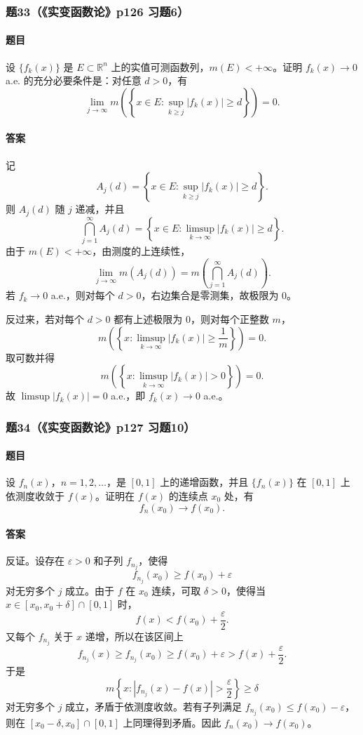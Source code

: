 \documentclass{article}
\newcommand{\R}{\mathbb{R}}
\newcommand{\eps}{\varepsilon}
\newcommand{\meas}{m}
\begin{document}
	\subsubsection*{题33（《实变函数论》p126 习题6）}
	\paragraph{题目}设 $\{f_k(x)\}$ 是 $E\subset\R^n$ 上的实值可测函数列，$\meas(E)<+\infty$。证明 $f_k(x)\to0$ a.e. 的充分必要条件是：对任意 $d>0$，有
	\[
	\lim_{j\to\infty}\meas\left(\left\{x\in E:\sup_{k\ge j}|f_k(x)|\ge d\right\}\right)=0.
	\]
	
	\paragraph{答案}记
	\[
	A_j(d)=\left\{x\in E:\sup_{k\ge j}|f_k(x)|\ge d\right\}.
	\]
	则 $A_j(d)$ 随 $j$ 递减，并且
	\[
	\bigcap_{j=1}^{\infty}A_j(d)=\left\{x\in E:\limsup_{k\to\infty}|f_k(x)|\ge d\right\}.
	\]
	由于 $\meas(E)<+\infty$，由测度的上连续性，
	\[
	\lim_{j\to\infty}\meas(A_j(d))
	=
	\meas\left(\bigcap_{j=1}^{\infty}A_j(d)\right).
	\]
	若 $f_k\to0$ a.e.，则对每个 $d>0$，右边集合是零测集，故极限为 $0$。
	
	反过来，若对每个 $d>0$ 都有上述极限为 $0$，则对每个正整数 $m$，
	\[
	\meas\left(\left\{x:\limsup_{k\to\infty}|f_k(x)|\ge \frac1m\right\}\right)=0.
	\]
	取可数并得
	\[
	\meas\left(\left\{x:\limsup_{k\to\infty}|f_k(x)|>0\right\}\right)=0.
	\]
	故 $\limsup |f_k(x)|=0$ a.e.，即 $f_k(x)\to0$ a.e.。
	
	\subsubsection*{题34（《实变函数论》p127 习题10）}
	\paragraph{题目}设 $f_n(x)$，$n=1,2,\ldots$，是 $[0,1]$ 上的递增函数，并且 $\{f_n(x)\}$ 在 $[0,1]$ 上依测度收敛于 $f(x)$。证明在 $f(x)$ 的连续点 $x_0$ 处，有
	\[
	f_n(x_0)\to f(x_0).
	\]
	
	\paragraph{答案}反证。设存在 $\eps>0$ 和子列 $f_{n_j}$，使得
	\[
	f_{n_j}(x_0)\ge f(x_0)+\eps
	\]
	对无穷多个 $j$ 成立。由于 $f$ 在 $x_0$ 连续，可取 $\delta>0$，使得当 $x\in[x_0,x_0+\delta]\cap[0,1]$ 时，
	\[
	f(x)<f(x_0)+\frac{\eps}{2}.
	\]
	又每个 $f_{n_j}$ 关于 $x$ 递增，所以在该区间上
	\[
	f_{n_j}(x)\ge f_{n_j}(x_0)
	\ge f(x_0)+\eps>f(x)+\frac{\eps}{2}.
	\]
	于是
	\[
	\meas\left\{x:|f_{n_j}(x)-f(x)|>\frac{\eps}{2}\right\}\ge\delta
	\]
	对无穷多个 $j$ 成立，矛盾于依测度收敛。若有子列满足 $f_{n_j}(x_0)\le f(x_0)-\eps$，则在 $[x_0-\delta,x_0]\cap[0,1]$ 上同理得到矛盾。因此 $f_n(x_0)\to f(x_0)$。
	
\end{document}
